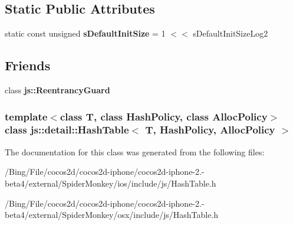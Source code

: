 \subsection*{Static Public Attributes}
\begin{DoxyCompactItemize}
\item 
\hypertarget{classjs_1_1detail_1_1_hash_table_aab740ebaa31532ee46854efa49b19fe1}{static const unsigned {\bfseries s\-Default\-Init\-Size} = 1 $<$$<$ s\-Default\-Init\-Size\-Log2}\label{classjs_1_1detail_1_1_hash_table_aab740ebaa31532ee46854efa49b19fe1}

\end{DoxyCompactItemize}
\subsection*{Friends}
\begin{DoxyCompactItemize}
\item 
\hypertarget{classjs_1_1detail_1_1_hash_table_af25b126e13e24a8f599f633a6e223a56}{class {\bfseries js\-::\-Reentrancy\-Guard}}\label{classjs_1_1detail_1_1_hash_table_af25b126e13e24a8f599f633a6e223a56}

\end{DoxyCompactItemize}
\subsubsection*{template$<$class T, class Hash\-Policy, class Alloc\-Policy$>$ class js\-::detail\-::\-Hash\-Table$<$ T, Hash\-Policy, Alloc\-Policy $>$}



The documentation for this class was generated from the following files\-:\begin{DoxyCompactItemize}
\item 
/\-Bing/\-File/cocos2d/cocos2d-\/iphone/cocos2d-\/iphone-\/2.-\/beta4/external/\-Spider\-Monkey/ios/include/js/Hash\-Table.\-h\item 
/\-Bing/\-File/cocos2d/cocos2d-\/iphone/cocos2d-\/iphone-\/2.-\/beta4/external/\-Spider\-Monkey/osx/include/js/Hash\-Table.\-h\end{DoxyCompactItemize}
